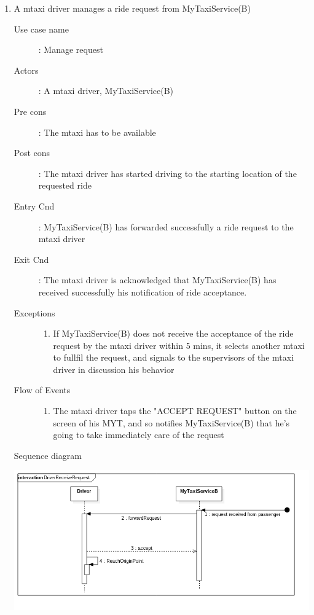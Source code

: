 \documentclass[11pt,titlepage]{article} %
\begin{document}
\begin{enumerate}
	
	        \item A mtaxi driver manages a ride request from MyTaxiService(B)
		\begin{description}
		        \item [Use case name]: Manage request
		        \item [Actors]: A mtaxi driver, MyTaxiService(B)
		        \item [Pre cons]: The mtaxi has to be available
		        \item [Post cons]: The mtaxi driver has started driving to the starting location of the requested ride
		        \item [Entry Cnd]: MyTaxiService(B) has forwarded successfully a ride request to the mtaxi driver
		        \item [Exit Cnd]: The mtaxi driver is acknowledged that MyTaxiService(B) has received successfully his notification
		        of ride acceptance.
		        \item [Exceptions]\hfill
			\begin{enumerate}
			          \item If MyTaxiService(B) does not receive the acceptance of the ride request by the mtaxi driver
			          within 5 mins, it selects another mtaxi to fullfil the request, and signals to the supervisors
			          of the mtaxi driver in discussion his behavior
			\end{enumerate}
		        \item [Flow of Events]\hfill
			\begin{enumerate}
			          \item The mtaxi driver taps the "ACCEPT REQUEST" button on the screen of his MYT, and so notifies MyTaxiService(B)
			          that he's going to take immediately care of the request
			\end{enumerate}
		\end{description}
		\newpage
		Sequence diagram
		\begin{center}
		\includegraphics[scale=0.52]{usecase5.png}
		\end{center}
	

\end{enumerate}
\end{document}
